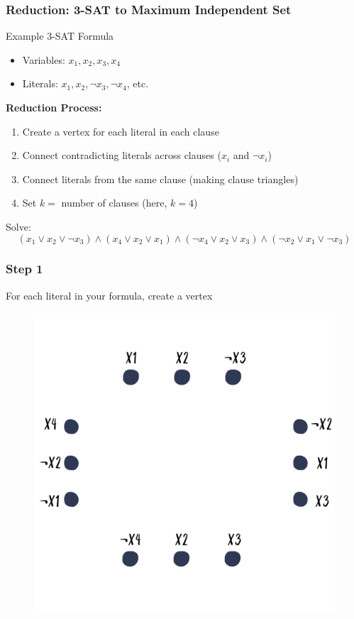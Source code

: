 \begin{frame}
  \frametitle{Reduction: 3-SAT to Maximum Independent Set}
  
  \begin{block}{Example 3-SAT Formula}
    \begin{itemize}
      \item Variables: $x_1, x_2, x_3, x_4$
      \item Literals: $x_1, x_2, \lnot x_3, \lnot x_4$, etc.
    
    \end{itemize}
  \end{block}
  
  \vspace{0.3cm}
  
  \textbf{Reduction Process:}
  \begin{enumerate}
    \item Create a vertex for each literal in each clause
    \item Connect contradicting literals across clauses ($x_i$ and $\lnot x_i$)
    \item Connect literals from the same clause (making clause triangles)
    \item Set $k =$ number of clauses (here, $k = 4$)
  \end{enumerate}
  
   \begin{block}{Solve: }
      \[
      (x_1 \lor x_2 \lor \lnot x_3) \land
      (x_4 \lor x_2 \lor x_1) \land
      (\lnot x_4 \lor x_2 \lor x_3) \land
      (\lnot x_2 \lor x_1 \lor \lnot x_3)
      \]
  \end{block}
 
\end{frame}
\begin{frame}
  \frametitle{Step 1}

 For each literal in your formula, create a vertex

  \begin{figure}[h!]
    \centering
    \includegraphics[width=0.45\linewidth]{figures/lec/reduction_1.png}
  \end{figure}
\end{frame}

